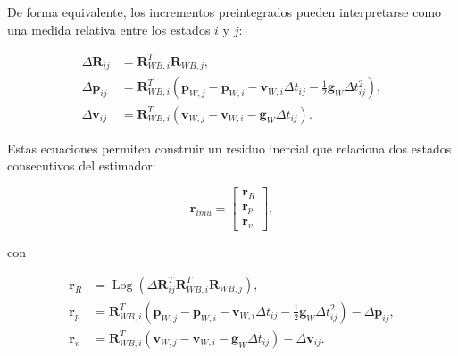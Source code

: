 De forma equivalente, los incrementos preintegrados pueden interpretarse como una medida relativa entre los estados $i$ y $j$:

\begin{equation}
\begin{aligned}
    \Delta \mathbf{R}_{ij}
    &=
    \mathbf{R}_{WB,i}^{T}
    \mathbf{R}_{WB,j},
    \\
    \Delta \mathbf{p}_{ij}
    &=
    \mathbf{R}_{WB,i}^{T}
    \left(
        \mathbf{p}_{W,j}
        -
        \mathbf{p}_{W,i}
        -
        \mathbf{v}_{W,i}
        \Delta t_{ij}
        -
        \frac{1}{2}
        \mathbf{g}_{W}
        \Delta t_{ij}^{2}
    \right),
    \\
    \Delta \mathbf{v}_{ij}
    &=
    \mathbf{R}_{WB,i}^{T}
    \left(
        \mathbf{v}_{W,j}
        -
        \mathbf{v}_{W,i}
        -
        \mathbf{g}_{W}
        \Delta t_{ij}
    \right).
\end{aligned}
\end{equation}

Estas ecuaciones permiten construir un residuo inercial que relaciona dos estados consecutivos del estimador:

\begin{equation}
    \mathbf{r}_{imu}
    =
    \begin{bmatrix}
        \mathbf{r}_{R} \\
        \mathbf{r}_{p} \\
        \mathbf{r}_{v}
    \end{bmatrix},
\end{equation}

con

\begin{equation}
\begin{aligned}
    \mathbf{r}_{R}
    &=
    \operatorname{Log}
    \left(
        \Delta \mathbf{R}_{ij}^{T}
        \mathbf{R}_{WB,i}^{T}
        \mathbf{R}_{WB,j}
    \right),
    \\
    \mathbf{r}_{p}
    &=
    \mathbf{R}_{WB,i}^{T}
    \left(
        \mathbf{p}_{W,j}
        -
        \mathbf{p}_{W,i}
        -
        \mathbf{v}_{W,i}
        \Delta t_{ij}
        -
        \frac{1}{2}
        \mathbf{g}_{W}
        \Delta t_{ij}^{2}
    \right)
    -
    \Delta \mathbf{p}_{ij},
    \\
    \mathbf{r}_{v}
    &=
    \mathbf{R}_{WB,i}^{T}
    \left(
        \mathbf{v}_{W,j}
        -
        \mathbf{v}_{W,i}
        -
        \mathbf{g}_{W}
        \Delta t_{ij}
    \right)
    -
    \Delta \mathbf{v}_{ij}.
\end{aligned}
\end{equation}

